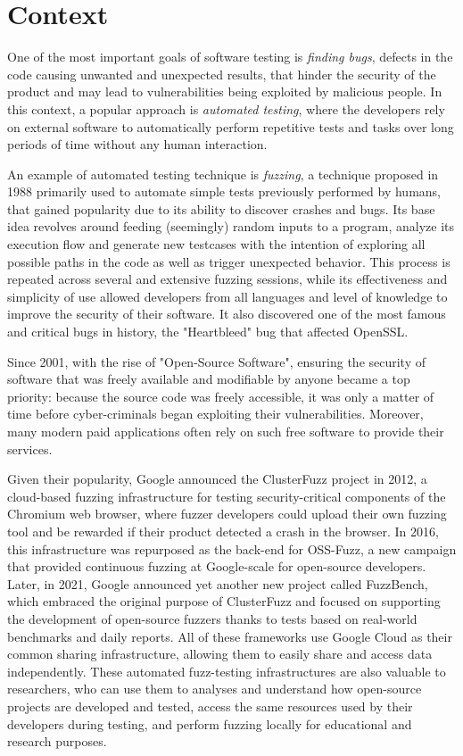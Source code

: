 \section{Context}
One of the most important goals of software testing is \textit{finding bugs}, defects in the code causing unwanted and unexpected results, that hinder the security of the product and may lead to vulnerabilities being exploited by malicious people. In this context, a popular approach is \textit{automated testing}, where the developers rely on external software to automatically perform repetitive tests and tasks over long periods of time without any human interaction.

An example of automated testing technique is \textit{fuzzing}, a technique proposed in 1988 \cite{fuzz_proposed} primarily used to automate simple tests previously performed by humans, that gained popularity due to its ability to discover crashes and bugs. Its base idea revolves around feeding (seemingly) random inputs to a program, analyze its execution flow and generate new testcases with the intention of exploring all possible paths in the code as well as trigger unexpected behavior. This process is repeated across several and extensive fuzzing sessions, while its effectiveness and simplicity of use allowed developers from all languages and level of knowledge to improve the security of their software. It also discovered one of the most famous and critical bugs in history, the "Heartbleed" bug that affected OpenSSL.

Since 2001, with the rise of "Open-Source Software", ensuring the security of software that was freely available and modifiable by anyone became a top priority: because the source code was freely accessible, it was only a matter of time before cyber-criminals began exploiting their vulnerabilities. Moreover, many modern paid applications often rely on such free software to provide their services. 

Given their popularity, Google announced the ClusterFuzz project in 2012, a cloud-based fuzzing infrastructure for testing security-critical components of the Chromium web browser, where fuzzer developers could upload their own fuzzing tool and be rewarded if their product detected a crash in the browser. In 2016, this infrastructure was repurposed as the back-end for OSS-Fuzz, a new campaign that provided continuous fuzzing at Google-scale for open-source developers. Later, in 2021, Google announced yet another new project called FuzzBench, which embraced the original purpose of ClusterFuzz and focused on supporting the development of open-source fuzzers thanks to tests based on real-world benchmarks and daily reports. All of these frameworks use Google Cloud as their common sharing infrastructure, allowing them to easily share and access data independently. These automated fuzz-testing infrastructures are also valuable to researchers, who can use them to analyses and understand how open-source projects are developed and tested, access the same resources used by their developers during testing, and perform fuzzing locally for educational and research purposes.

